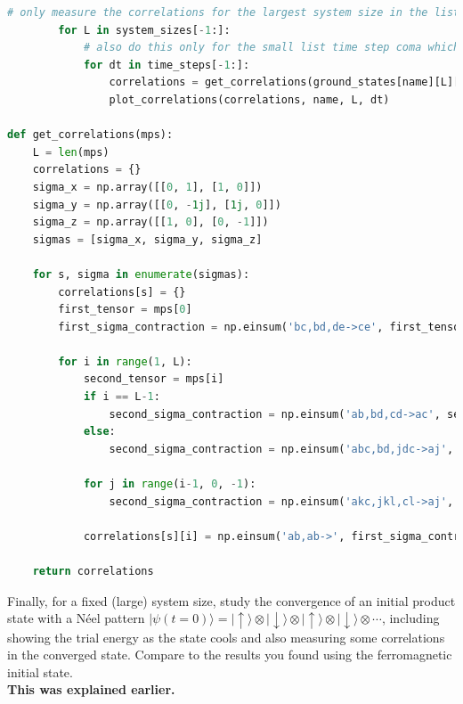 \documentclass[12pt]{article}
\begin{document}
\begin{lstlisting}[language=Python]
# only measure the correlations for the largest system size in the list
        for L in system_sizes[-1:]:
            # also do this only for the small list time step coma which is at the end of the list
            for dt in time_steps[-1:]:
                correlations = get_correlations(ground_states[name][L][dt])
                plot_correlations(correlations, name, L, dt)

def get_correlations(mps):
    L = len(mps)
    correlations = {}
    sigma_x = np.array([[0, 1], [1, 0]])
    sigma_y = np.array([[0, -1j], [1j, 0]])
    sigma_z = np.array([[1, 0], [0, -1]])
    sigmas = [sigma_x, sigma_y, sigma_z]

    for s, sigma in enumerate(sigmas):
        correlations[s] = {}
        first_tensor = mps[0]
        first_sigma_contraction = np.einsum('bc,bd,de->ce', first_tensor.conj(), sigma, first_tensor)
        
        for i in range(1, L):
            second_tensor = mps[i]
            if i == L-1:
                second_sigma_contraction = np.einsum('ab,bd,cd->ac', second_tensor.conj(), sigma, second_tensor)
            else:
                second_sigma_contraction = np.einsum('abc,bd,jdc->aj', second_tensor.conj(), sigma, second_tensor)
            
            for j in range(i-1, 0, -1):
                second_sigma_contraction = np.einsum('akc,jkl,cl->aj', mps[j].conj(), mps[j], second_sigma_contraction)
            
            correlations[s][i] = np.einsum('ab,ab->', first_sigma_contraction, second_sigma_contraction)

    return correlations
\end{lstlisting}





Finally, for a fixed (large) system size, study the convergence of an initial product state with a Néel pattern $|\psi(t=0)\rangle=|\uparrow\rangle \otimes|\downarrow\rangle \otimes|\uparrow\rangle \otimes|\downarrow\rangle \otimes \cdots$, including showing the trial energy as the state cools and also measuring some correlations in the converged state. Compare to the results you found using the ferromagnetic initial state.\\
\textbf{This was explained earlier.}
\newpage
\end{document}
